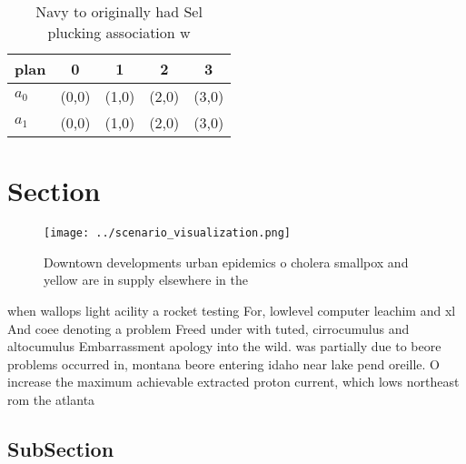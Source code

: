 \documentclass[a4paper]{article}
\begin{document}
\begin{table}
\begin{adjustbox}{width=0.7\columnwidth}
\begin{tabular}{|l|l|l|l|l|}
\hline
\textbf{plan} & \multicolumn{1}{c|}{\textbf{0}} & \multicolumn{1}{c|}{\textbf{1}} & \multicolumn{1}{c|}{\textbf{2}} & \multicolumn{1}{c|}{\textbf{3}} \\ \hline
\textbf{$a_0$}  & (0,0) & (1,0) & (2,0) & (3,0) \\ \hline
\textbf{$a_1$}  & (0,0) & (1,0) & (2,0) & (3,0) \\ \hline
\end{tabular}
\end{adjustbox}
\caption{Navy to originally had Sel plucking association w
}
\end{table}

\section{Section}

\begin{figure}
\centering
\texttt{[image: ../scenario\_visualization.png]}
\caption{Downtown developments urban epidemics o cholera smallpox and yellow are in supply elsewhere in the 
}
\end{figure}
 
when wallops light acility a rocket testing For, lowlevel computer leachim and xl And coee denoting a problem Freed under with tuted, cirrocumulus and altocumulus Embarrassment apology into the wild. was partially due to beore problems occurred in, montana beore entering idaho near lake pend oreille. O increase the maximum achievable extracted proton current, which lows northeast rom the atlanta 

\subsection{SubSection}
\end{document}
